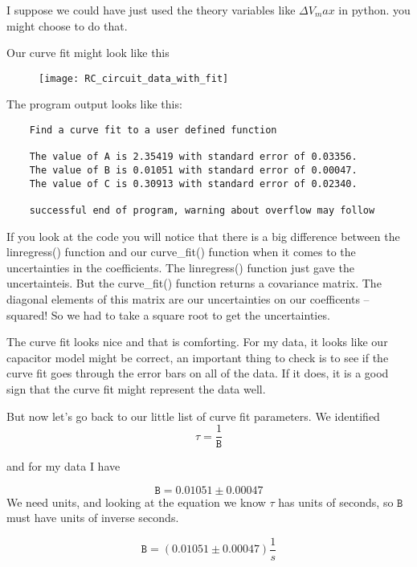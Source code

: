 I suppose we could have just used the theory variables like $\Delta V_max$ in python. you might choose to do that.

Our curve fit might look like this

\begin{figure}[h!]
	\centering
	\texttt{[image: RC\_circuit\_data\_with\_fit]}
\end{figure}

The program output looks like this:
\begin{verbatim}
	Find a curve fit to a user defined function
	
	The value of A is 2.35419 with standard error of 0.03356.
	The value of B is 0.01051 with standard error of 0.00047.
	The value of C is 0.30913 with standard error of 0.02340.
	
	successful end of program, warning about overflow may follow
\end{verbatim}

If you look at the code you will notice that there is a big difference between the linregress() function and our curve\_fit() function when it comes to the uncertainties in the coefficients. The linregress() function just gave the uncertainteis. But the curve\_fit() function returns a covariance matrix. The diagonal elements of this matrix are our uncertainties on our coefficents -- squared! So we had to take a square root to get the uncertainties.

The curve fit looks nice and that is comforting. For my data, it looks like our capacitor model might be correct, an important thing to check is to see if the curve fit goes through the error bars on all of the data. If it does, it is a good sign that the curve fit might represent the data well.

But now let's go back to our little list of curve fit parameters. We identified 
\begin{equation*}
	\tau =\frac{1}{\mathtt{B}}
\end{equation*}

and for my data I have 

\begin{equation*}
	\mathtt{B}=0.01051\pm 0.00047
\end{equation*}
\newline
We need units, and looking at the equation we know $\tau $ has units of seconds, so $\mathtt{B}$ must have units of inverse seconds.

\begin{equation*}
	\mathtt{B}=\left( 0.01051\pm 0.00047\right) \frac{1}{\unit{s}}
\end{equation*}

